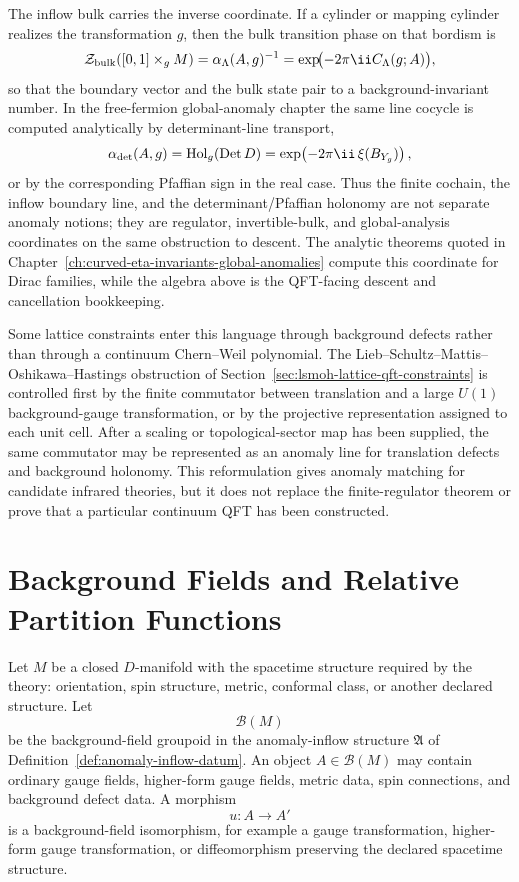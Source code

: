 The inflow bulk carries the inverse coordinate.  If a cylinder or mapping
cylinder realizes the transformation \(g\), then the bulk transition phase on
that bordism is
\begin{equation}
  \mathcal Z_{\rm bulk}([0,1]\times_g M)
  =
  \alpha_\Lambda(A,g)^{-1}
  =
  \exp\!\bigl(-2\pi\ii C_\Lambda(g;A)\bigr),
  \label{eq:inflow-bulk-inverse-line-coordinate}
\end{equation}
so that the boundary vector and the bulk state pair to a background-invariant
number.  In the free-fermion global-anomaly chapter the same line cocycle is
computed analytically by determinant-line transport,
\[
  \alpha_{\rm det}(A,g)
  =
  \operatorname{Hol}_g(\operatorname{Det}D)
  =
  \exp\!\left(-2\pi\ii\,\xi(B_{Y_g})\right),
\]
or by the corresponding Pfaffian sign in the real case.  Thus the finite
cochain, the inflow boundary line, and the determinant/Pfaffian holonomy are
not separate anomaly notions; they are regulator, invertible-bulk, and
global-analysis coordinates on the same obstruction to descent.  The analytic
theorems quoted in Chapter~\ref{ch:curved-eta-invariants-global-anomalies}
compute this coordinate for Dirac families, while the algebra above is the
QFT-facing descent and cancellation bookkeeping.

Some lattice constraints enter this language through background defects rather
than through a continuum Chern--Weil polynomial.  The
Lieb--Schultz--Mattis--Oshikawa--Hastings obstruction of
Section~\ref{sec:lsmoh-lattice-qft-constraints} is controlled first by the
finite commutator between translation and a large \(U(1)\) background-gauge
transformation, or by the projective representation assigned to each unit cell.
After a scaling or topological-sector map has been supplied, the same
commutator may be represented as an anomaly line for translation defects and
background holonomy.  This reformulation gives anomaly matching for candidate
infrared theories, but it does not replace the finite-regulator theorem or
prove that a particular continuum QFT has been constructed.

\section{Background Fields and Relative Partition Functions}

Let \(M\) be a closed \(D\)-manifold with the spacetime structure required by
the theory: orientation, spin structure, metric, conformal class, or another
declared structure.  Let
\[
  \mathcal B(M)
\]
be the background-field groupoid in the anomaly-inflow structure
\(\mathfrak A\) of Definition~\ref{def:anomaly-inflow-datum}.  An object \(A\in
\mathcal B(M)\) may contain ordinary gauge fields, higher-form gauge fields,
metric data, spin connections, and background defect data.  A morphism
\[
  u:A\longrightarrow A'
\]
is a background-field isomorphism, for example a gauge transformation,
higher-form gauge transformation, or diffeomorphism preserving the declared
spacetime structure.

